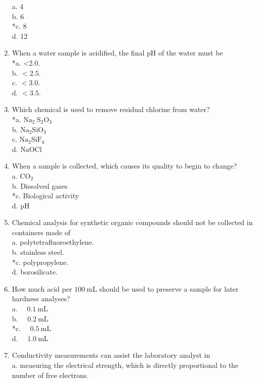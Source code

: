\begin{enumerate}[1.]
a. 4\\
b. 6\\
*c. 8\\
d. 12\\
\item When a water sample is acidified, the final pH of the water must be\\
*a. <2.0.\\
b. $<2.5$.\\
c. $<3.0$.\\
d. $<3.5$.\\
\item Which chemical is used to remove residual chlorine from water?\\
*a. $\mathrm{Na}_{2} \mathrm{~S}_{2} \mathrm{O}_{3}$\\
b. $\mathrm{Na}_{2} \mathrm{SiO}_{3}$\\
c. $\mathrm{Na}_{2} \mathrm{SiF}_{6}$\\
d. $\mathrm{NaOCl}$\\
\item When a sample is collected, which causes its quality to begin to change?\\
a. $\mathrm{CO}_{2}$\\
b. Dissolved gases\\
*c. Biological activity\\
d. pH\\
\item Chemical analysis for synthetic organic compounds should not be collected in containers made of\\
a. polytetrafluoroethylene.\\
b. stainless steel.\\
*c. polypropylene.\\
d. borosilicate.\\
\item How much acid per $100 \mathrm{~mL}$ should be used to preserve a sample for later hardness analyses?\\
a. $\quad 0.1 \mathrm{~mL}$\\
b. $\quad 0.2 \mathrm{~mL}$\\
*c. $\quad 0.5 \mathrm{~mL}$\\
d. $\quad 1.0 \mathrm{~mL}$\\
\item Conductivity measurements can assist the laboratory analyst in\\
a. measuring the electrical strength, which is directly proportional to the number of free electrons.\\

\end{enumerate}
